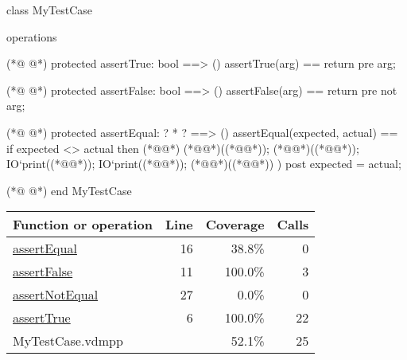 \begin{vdmpp}[breaklines=true]
class MyTestCase

operations


(*@
\label{assertTrue:6}
@*)
 protected assertTrue: bool ==> ()
 assertTrue(arg) == 
  return 
 pre arg;
  
(*@
\label{assertFalse:11}
@*)
 protected assertFalse: bool ==> ()
 assertFalse(arg) == 
  return 
 pre not arg;
 
(*@
\label{assertEqual:16}
@*)
 protected assertEqual: ? * ? ==> ()
 assertEqual(expected, actual) == 
  if expected <> actual then (*@\vdmnotcovered{(}@*)
     (*@@*)((*@@*));
     (*@@*)((*@@*)); 
     IO`print((*@@*));
     IO`print((*@@*));
     (*@@*)((*@@*))
  )
 post expected = actual;

(*@
\label{assertNotEqual:27}
@*)
end MyTestCase
\end{vdmpp}
\bigskip
\begin{longtable}{|l|r|r|r|}
\hline
Function or operation & Line & Coverage & Calls \\
\hline
\hline
\hyperref[assertEqual:16]{assertEqual} & 16&38.8\% & 0 \\
\hline
\hyperref[assertFalse:11]{assertFalse} & 11&100.0\% & 3 \\
\hline
\hyperref[assertNotEqual:27]{assertNotEqual} & 27&0.0\% & 0 \\
\hline
\hyperref[assertTrue:6]{assertTrue} & 6&100.0\% & 22 \\
\hline
\hline
MyTestCase.vdmpp & & 52.1\% & 25 \\
\hline
\end{longtable}

